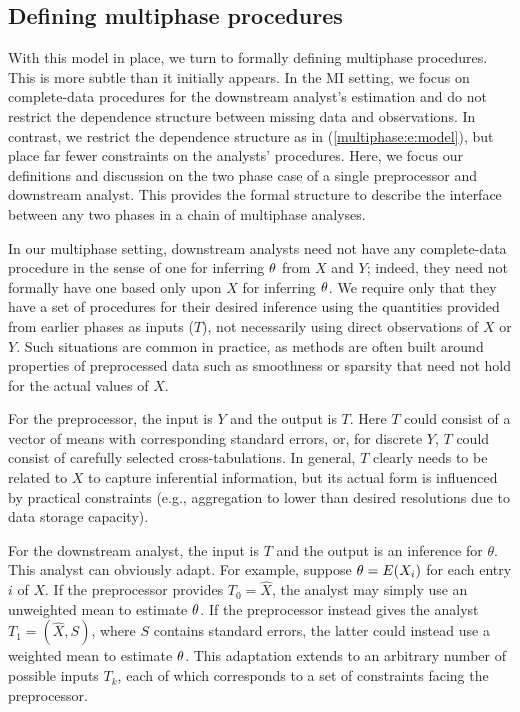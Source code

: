 \subsection{Defining multiphase procedures}
\label{multiphase:sec:def}

With this model in place, we turn to formally defining multiphase procedures.
This is more subtle than it initially appears.
In the MI setting, we focus on complete-data procedures for the downstream analyst's estimation and do not restrict the dependence structure between missing data and observations.
In contrast, we restrict the dependence structure as in (\ref{multiphase:e:model}), but place far fewer constraints on the analysts' procedures.
Here, we focus our definitions and discussion on the two phase case of a single preprocessor and downstream analyst.
This provides the formal structure to describe the interface between any two phases in a chain of multiphase analyses.

In our multiphase setting, downstream analysts need not have any complete-data procedure in the sense of one for inferring $\theta$ from $X$ and $Y$; indeed, they need not formally have one based only upon $X$ for inferring $\theta$.
We require only that they have a set of procedures for their desired inference using the quantities provided from earlier phases as inputs ($T$),  not necessarily  using direct observations of $X$ or $Y$.
Such situations are common in practice, as methods are often built around properties of preprocessed data such as smoothness or sparsity that need not hold for the actual values of $X$.

For the preprocessor, the input  is $Y$ and the output is $T$.
 Here  $T$ could consist of a vector of means with corresponding standard errors, or,  for discrete $Y$, $T$ could consist of carefully selected cross-tabulations.
In general, $T$ clearly needs to be related to $X$ to capture inferential information, but its actual form is influenced by practical constraints (e.g., aggregation to lower than desired resolutions due to data storage capacity).

For the downstream analyst, the input is $T$ and the output is an inference for $\theta$. 
This analyst can obviously adapt. 
For example, suppose $\theta = E(X_i)$ for each entry $i$ of $X$.
If the preprocessor provides $T_0 = \hat{X}$, the analyst may simply use an unweighted mean to estimate $\theta$.
If the preprocessor instead gives the analyst $T_1 = (\hat{X}, S)$, where $S$ contains standard errors, the latter could instead use a weighted mean to estimate $\theta$.
This adaptation extends to an arbitrary number of possible inputs $T_k$, each of which corresponds to a set of constraints facing the preprocessor.

